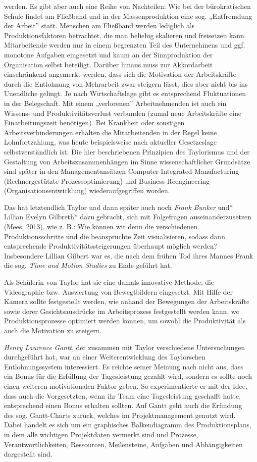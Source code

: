 \documentclass[
  letterpaper,
]{book}
\begin{document}
werden. Es gibt aber auch eine Reihe von Nachteilen: Wie bei der
bürokratischen Schule findet am Fließband und in der Massenproduktion
eine sog. „Entfremdung der Arbeit'' statt. Menschen am Fließband werden
lediglich als Produktionsfaktoren betrachtet, die man beliebig skalieren
und freisetzen kann. Mitarbeitende werden nur in einem begrenzten Teil
des Unternehmens und ggf. monotone Aufgaben eingesetzt und kaum an der
Sinnproduktion der Organisation selbst beteiligt. Darüber hinaus muss
zur Akkordarbeit einschränkend angemerkt werden, dass sich die
Motivation der Arbeitskräfte durch die Entlohnung von Mehrarbeit zwar
steigern lässt, dies aber nicht bis ins Unendliche gelingt. Je nach
Wirtschaftslage gibt es entsprechend Fluktuationen in der Belegschaft.
Mit einem „verlorenen'' Arbeitnehmenden ist auch ein Wissens- und
Produktivitätsverlust verbunden (zumal neue Arbeitskräfte eine
Einarbeitungszeit benötigen). Bei Krankheit oder sonstigen
Arbeitsverhinderungen erhalten die Mitarbeitenden in der Regel keine
Lohnfortzahlung, was heute beispielsweise nach aktueller Gesetzeslage
selbstverständlich ist. Die hier beschriebenen Prinzipien des
Taylorismus und der Gestaltung von Arbeitszusammenhängen im Sinne
wissenschaftlicher Grundsätze sind später in den Managementansätzen
Computer-Integrated-Manufacturing (Rechnergestützte Prozessoptimierung)
und Business-Reengineering (Organisationsentwicklung) wiederaufgegriffen
worden.

Das hat letztendlich Taylor und dann später auch noch \emph{Frank Bunker
}und* Lillian Evelyn Gilbreth* dazu gebracht, sich mit Folgefragen
auseinanderzusetzen (Mees, 2013), wie z. B.: Wie können wir denn die
verschiedenen Produktionsschritte und die beanspruchte Zeit
visualisieren, sodass dann entsprechende Produktivitätssteigerungen
überhaupt möglich werden? Insbesondere Lillian Gilbert war es, die nach
dem frühen Tod ihres Mannes Frank die sog. \emph{Time and Motion
Studies} zu Ende geführt hat.

Als Schülerin von Taylor hat sie eine damals innovative Methode, die
Videographie bzw. Auswertung von Bewegtbildern eingesetzt. Mit Hilfe der
Kamera sollte festgestellt werden, wie anhand der Bewegungen der
Arbeitskräfte sowie derer Gesichtsausdrücke im Arbeitsprozess
festgestellt werden kann, wo Produktionsprozesse optimiert werden
können, um sowohl die Produktivität als auch die Motivation zu steigern.

\emph{Henry Laurence Gantt}, der zusammen mit Taylor verschiedene
Untersuchungen durchgeführt hat, war an einer Weiterentwicklung des
Taylorschen Entlohnungssystem interessiert. Es reichte seiner Meinung
nach nicht aus, dass ein Bonus für die Erfüllung der Tagesleistung
gezahlt wird, sondern es sollte noch einen weiteren motivationalen
Faktor geben. So experimentierte er mit der Idee, dass auch die
Vorgesetzten, wenn ihr Team eine Tagesleistung geschafft hatte,
entsprechend einen Bonus erhalten sollten. Auf Gantt geht auch die
Erfindung des sog. Gantt-Charts zurück, welches im Projektmanagement
genutzt wird. Dabei handelt es sich um ein graphisches Balkendiagramm
des Produktionsplans, in dem alle wichtigen Projektdaten vermerkt sind
und Prozesse, Verantwortlichkeiten, Ressourcen, Meilensteine, Aufgaben
und Abhängigkeiten dargestellt sind.
\end{document}

